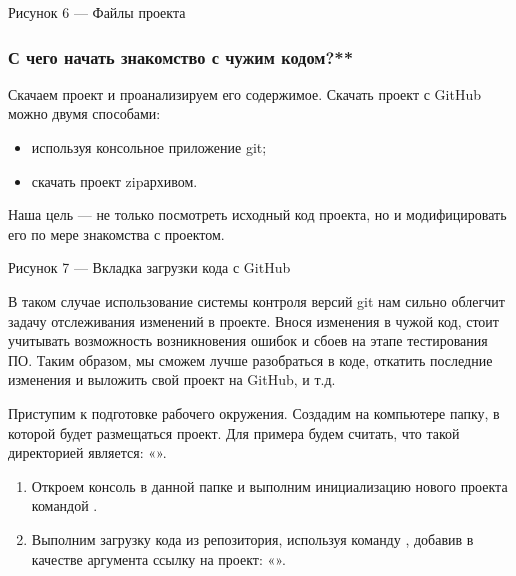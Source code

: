 \documentclass[letterpaper,10pt,russian]{sphinxmanual}
\begin{document}
\sphinxAtStartPar
Рисунок 6 — Файлы проекта


\subsubsection{С чего начать знакомство с чужим кодом?**}
\label{\detokenize{educational_materials/github/content:id4}}
\sphinxAtStartPar
Скачаем проект и проанализируем его содержимое. Скачать проект с GitHub можно двумя способами:
\begin{itemize}
\item {} 
\sphinxAtStartPar
используя консольное приложение git;

\item {} 
\sphinxAtStartPar
скачать проект zip\sphinxhyphen{}архивом.

\end{itemize}

\sphinxAtStartPar
Наша цель — не только посмотреть исходный код проекта, но и модифицировать его по мере знакомства с проектом.

\sphinxAtStartPar
{}

\sphinxAtStartPar
Рисунок 7 — Вкладка загрузки кода с GitHub

\sphinxAtStartPar
В таком случае использование системы контроля версий git нам сильно облегчит задачу отслеживания изменений в проекте. Внося изменения в чужой код, стоит учитывать возможность возникновения ошибок и сбоев на этапе тестирования ПО. Таким образом, мы сможем лучше разобраться в коде, откатить последние изменения и выложить свой проект на GitHub, и т.д.

\sphinxAtStartPar
Приступим к подготовке рабочего окружения. Создадим на компьютере папку, в которой будет размещаться проект. Для примера будем считать, что такой директорией является: «».
\begin{enumerate}
%
\item {} 
\sphinxAtStartPar
Откроем консоль в данной папке и выполним инициализацию нового проекта командой .

\item {} 
\sphinxAtStartPar
Выполним загрузку кода из репозитория, используя команду , добавив в качестве аргумента ссылку на проект: «».

\end{enumerate}
\end{document}
